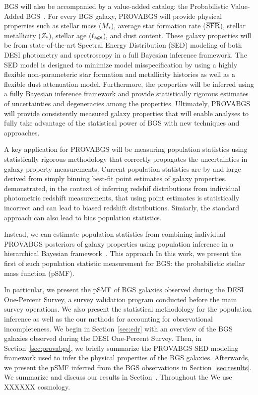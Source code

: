 BGS will also be accompanied by a value-added catalog: the Probabilistic
Value-Added BGS~\citep[PROVABGS;][]{hahn2022, kwon2022}.  
For every BGS galaxy, PROVABGS will provide physical properties such as stellar
mass ($M_*$), average star formation rate ($\overline{\rm SFR}$), stellar
metallicity ($Z_*$), stellar age ($t_{\rm age}$), and dust content. 
These galaxy properties will be from state-of-the-art Spectral Energy
Distribution (SED) modeling of both DESI photometry and spectroscopy in a full
Bayesian inference framework. 
The SED model is designed to minimize model misspecification by using a highly
flexible non-parameteric star formation and metallicity histories as well as a
flexible dust attenuation model.
Furthermore, the properties will be inferred using a fully Bayesian inference
framework and provide statistically rigorous estimates of uncertainties and
degeneracies among the properties.  
Ultimately, PROVABGS will provide consistently measured galaxy properties that
will enable analyses to fully take advantage of the statistical power of BGS
with new techniques and approaches. 

A key application for PROVABGS will be measuring population statistics using 
statistically rigorous methodology that correctly propagates the uncertainties
in galaxy property measurements. 
Current population statistics are by and large derived from simply binning
best-fit point estimates of galaxy properties. 
\cite{malz2020} demonstrated, in the context of inferring redshif distributions
from individual photometric redshift measurements, that using point estimates
is statistically incorrect and can lead to biased redshift distributions. 
Simiarly, the standard approach can also lead to bias population statistics. 

Instead, we can estimate population statistics from combining individual
PROVABGS posteriors of galaxy properties using population inference in a
hierarchical Bayesian framework~\citep[\emph{e.g.}][]{hogg2010,
foreman-mackey2014, baronchelli2020}.
This approach 
In this work, we present the first of such population statistic measurement for
BGS: the probabilistic stellar mass function (pSMF). 

In particular, we present the pSMF of BGS galaxies observed during the DESI
One-Percent Survey, a survey validation program conducted before the main
survey operations. 
We also present the statistical methodology for the population inference as
well as the our methods for accounting for observational incompleteness. 
We begin in Section~\ref{sec:edr} with an overview of the BGS galaxies observed
during the DESI One-Percent Survey. 
Then, in Section~\ref{sec:provabgs}, we briefly summarize the PROVABGS SED
modeling framework used to infer the physical properties of the BGS galaxies.
Afterwards, we present the pSMF inferred from the BGS observations in
Section~\ref{sec:results}. 
We summarize and discuss our results in Section~\cite{sec:summary}.
Throughout the 
We use XXXXXX cosmology.
